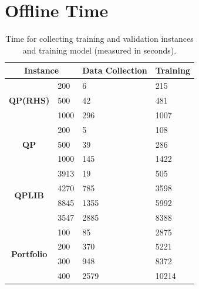 \documentclass[10pt]{article} %
\begin{document}
\begin{table}[ht]
    \centering
    \caption{Solver configurations.}
    \label{tab:solver_settings}
\end{table}


\section{Offline Time}
\begin{table}[ht]
	\centering
	\caption{Time for collecting training and validation instances and training model (measured in seconds).}
	\label{tab:offline_time}
	\begin{tabular}{@{}cl l l}
	\toprule
        \multicolumn{2}{c}{\bf Instance} & \multicolumn{1}{c}{\bf Data Collection}  & \multicolumn{1}{c}{\bf Training} \\
        \midrule 
        \multirow{3}{*}{\textbf{QP(RHS)}}
        &200 & 6    &  215    \\
        &500 & 42   &  481    \\
        &1000 & 296 &  1007     \\
        \midrule
        \multirow{3}{*}{\textbf{QP}}
        &200 & 5    &   108  \\
        &500 & 39   &   286      \\
        &1000 & 145 &   1422    \\
        \midrule
        \multirow{4}{*}{\textbf{QPLIB}}
        &3913 & 19  &  505   \\
        &4270 & 785 &  3598  \\
        &8845 & 1355&  5992  \\
        &3547& 2885 &  8388  \\
        \midrule
        \multirow{4}{*}{\textbf{Portfolio}}
        &100 & 85   &        2875\\
        &200 & 370  &        5221\\
        &300 & 948  &        8372\\
        &400& 2579  &        10214\\
        \bottomrule
	\end{tabular}
\end{table}
\end{document}

